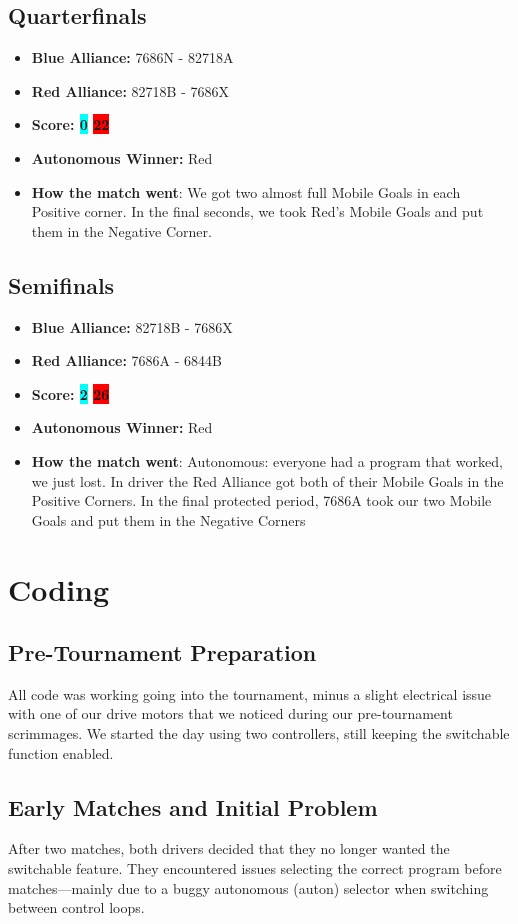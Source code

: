 \subsection*{Quarterfinals}
\begin{itemize}
    \item \textbf{Blue Alliance:} 7686N - 82718A
    \item \textbf{Red Alliance:} 82718B - 7686X
    \item \textbf{Score: \colorbox{cyan}{0} \colorbox{red}{22}}
    \item \textbf{Autonomous Winner:} Red
    \item \textbf{How the match went}:  We got two almost full Mobile Goals in each Positive corner. In the final seconds, we took Red's Mobile Goals and put them in the Negative Corner.
\end{itemize}
\subsection*{Semifinals}
\begin{itemize}
    \item \textbf{Blue Alliance:} 82718B - 7686X
    \item \textbf{Red Alliance:} 7686A - 6844B
    \item \textbf{Score: \colorbox{cyan}{2} \colorbox{red}{26}}
    \item \textbf{Autonomous Winner:} Red
    \item \textbf{How the match went}: Autonomous: everyone had a program that worked, we just lost. In driver the Red Alliance got both of their Mobile Goals in the Positive Corners. In the final protected period, 7686A took our two Mobile Goals and put them in the Negative Corners
\end{itemize}

\section*{Coding}
\subsection*{Pre-Tournament Preparation}
All code was working going into the tournament, minus a slight electrical issue with one of our drive motors that we noticed during our pre-tournament scrimmages. We started the day using two controllers, still keeping the switchable function enabled.

\subsection*{Early Matches and Initial Problem}
After two matches, both drivers decided that they no longer wanted the switchable feature. They encountered issues selecting the correct program before matches—mainly due to a buggy autonomous (auton) selector when switching between control loops.


